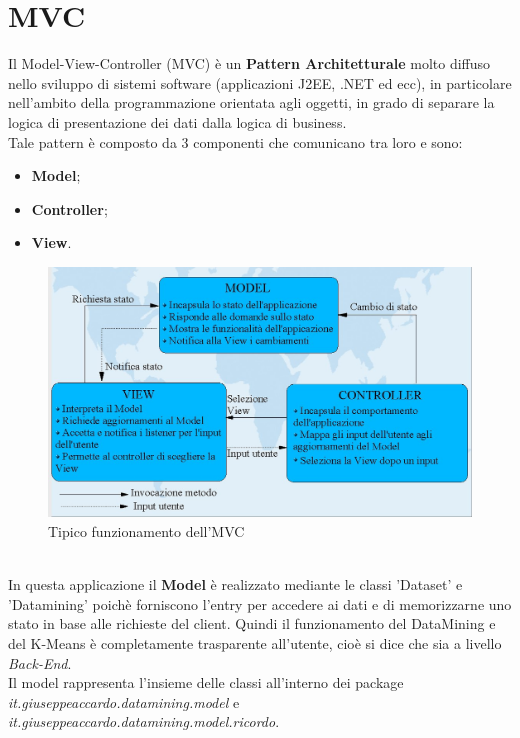 \documentclass[a4paper, oneside]{book}
\begin{document}
\section*{MVC}
Il Model-View-Controller (MVC) è un \textbf{Pattern Architetturale} molto diffuso nello sviluppo di sistemi software (applicazioni J2EE, .NET ed ecc), in particolare nell'ambito della programmazione orientata agli oggetti, in grado di separare la logica di presentazione dei dati dalla logica di business. 
\\
Tale pattern è composto da 3 componenti che comunicano tra loro e sono:
     \begin{itemize}
        \item{\textbf{Model};}
        \item{\textbf{Controller};}
        \item{\textbf{View}.}
      \end{itemize}
\begin{figure}[htp]
\centering
\includegraphics[width=14cm]{mvc.jpg}
\caption{Tipico funzionamento dell'MVC}
\label{fig:mvc}
\end{figure}
\\
In questa applicazione il \textbf{Model} è realizzato mediante le classi 'Dataset' e 'Datamining' poichè forniscono l'entry per accedere ai dati e di memorizzarne uno stato in base alle richieste del client. Quindi il funzionamento del DataMining e del K-Means è completamente trasparente all'utente, cioè si dice che sia a livello \textit{Back-End}. \\ Il model rappresenta l'insieme delle classi all'interno dei package  \textit{it.giuseppeaccardo.datamining.model} e \textit{it.giuseppeaccardo.datamining.model.ricordo}.\\
\\
\end{document}

